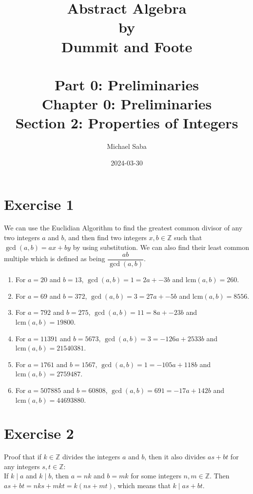 \documentclass[12pt]{article}
\title{%
    \Huge Abstract Algebra \\
    \large by \\
    \Large Dummit and Foote \\~\\
    \huge Part 0: Preliminaries \\
    \LARGE Chapter 0: Preliminaries \\
    \Large Section 2: Properties of Integers
}
\date{2024-03-30}
\author{Michael Saba}
\newcommand{\Z}{\mathbb{Z}}
\newcommand{\lcm}{\text{lcm}}
\begin{document}
    \maketitle
    \newpage

    \section*{Exercise 1}
    We can use the Euclidian Algorithm to find the 
    greatest common divisor of any two integers $a$ and $b$,
    and then find two integers $x, b \in \Z$
    such that $\gcd(a, b) = ax + by$ by using substitution.
    We can also find their least common multiple
    which is defined as being $\dfrac{ab}{\gcd(a, b)}$.
    \begin{enumerate}[label=\textbf{\alph*.}]
        \item 
            For $a = 20$ and $b = 13$,
            $\gcd(a, b) = 1 = 2a + -3b$
            and $\lcm(a, b) = 260$.
        \item 
            For $a = 69$ and $b = 372$,
            $\gcd(a, b) = 3 = 27a + -5b$
            and $\lcm(a, b) = 8556$.
        \item 
            For $a = 792$ and $b = 275$,
            $\gcd(a, b) = 11 = 8a + -23b$
            and $\lcm(a, b) = 19800$.
        \item 
            For $a = 11391$ and $b = 5673$,
            $\gcd(a, b) = 3 = -126a + 2533b$
            and $\lcm(a, b) = 21540381$.
        \item 
            For $a = 1761$ and $b = 1567$,
            $\gcd(a, b) = 1 = -105a + 118b$
            and $\lcm(a, b) = 2759487$.
        \item 
            For $a = 507885$ and $b = 60808$,
            $\gcd(a, b) = 691 = -17a + 142b$
            and $\lcm(a, b) = 44693880$.            
    \end{enumerate} 

    \section*{Exercise 2}
    Proof that if $k \in \Z$ divides the integers $a$ and $b$,
    then it also divides $as + bt$ for any integers $s, t \in \Z$: \\
    If $k \mid a$ and $k \mid b$,
    then $a = nk$ and $b = mk$ for some integers $n, m \in \Z$.
    Then $as + bt = nks + mkt = k(ns + mt)$,
    which means that $k \mid as + bt$. \\
\end{document}
